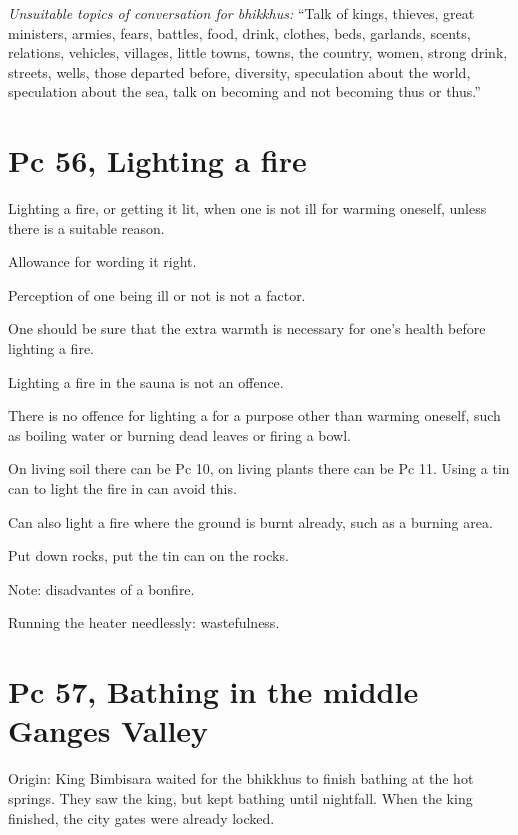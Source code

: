\emph{Unsuitable topics of conversation for bhikkhus:} ``Talk of kings,
thieves, great ministers, armies, fears, battles, food, drink, clothes,
beds, garlands, scents, relations, vehicles, villages, little towns,
towns, the country, women, strong drink, streets, wells, those departed
before, diversity, speculation about the world, speculation about the
sea, talk on becoming and not becoming thus or thus.''

\section{Pc 56, Lighting a fire}

\begin{multicols}{2}

Lighting a fire, or getting it lit, when one is not ill for warming
oneself, unless there is a suitable reason.

Allowance for wording it right.

Perception of one being ill or not is not a factor.

One should be sure that the extra warmth is necessary for one's health
before lighting a fire.

Lighting a fire in the sauna is not an offence.

There is no offence for lighting a for a purpose other than warming
oneself, such as boiling water or burning dead leaves or firing a bowl.

On living soil there can be Pc 10, on living plants there can be Pc 11.
Using a tin can to light the fire in can avoid this.

Can also light a fire where the ground is burnt already, such as a
burning area.

Put down rocks, put the tin can on the rocks.

Note: disadvantes of a bonfire.

Running the heater needlessly: wastefulness.

\end{multicols}

\section{Pc 57, Bathing in the middle Ganges Valley}

Origin: King Bimbisara waited for the bhikkhus to finish bathing at the
hot springs. They saw the king, but kept bathing until nightfall. When
the king finished, the city gates were already locked.

